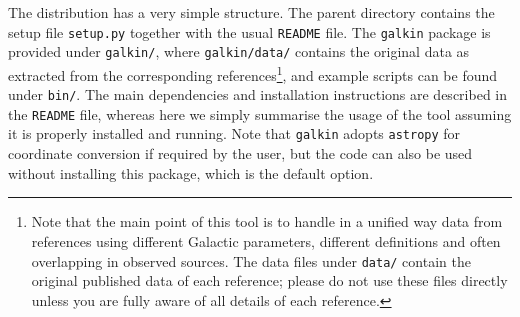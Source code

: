 \documentclass[twocolumn,prd,reprint,preprintnumbers,amsmath,amssymb,superscriptaddress,nofootinbib]{revtex4}
\begin{document}
\par The distribution has a very simple structure. The parent directory contains the setup file \texttt{setup.py} together with the usual \texttt{README} file. The \texttt{galkin} package is provided under \texttt{galkin/}, where \texttt{galkin/data/} contains the original data as extracted from the corresponding references\footnote{Note that the main point of this tool is to handle in a unified way data from references using different Galactic parameters, different definitions and often overlapping in observed sources. The data files under \texttt{data/} contain the original published data of each reference; please do not use these files directly unless you are fully aware of all details of each reference.}, and example scripts can be found under \texttt{bin/}. The main dependencies and installation instructions are described in the \texttt{README} file, whereas here we simply summarise the usage of the tool assuming it is properly installed and running.
Note that \texttt{galkin} adopts \texttt{astropy} \cite{2013A&A...558A..33A} for coordinate conversion if required by the user, but the code can also be used without installing this package, which is the default option.
\end{document}
